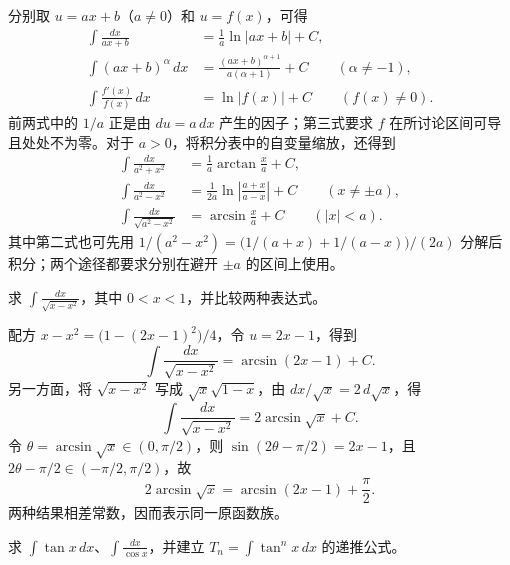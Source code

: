 分别取 $u=ax+b$（$a\neq0$）和 $u=f(x)$，可得
\begin{align*}
    \int\frac{dx}{ax+b}&=\frac1a\ln|ax+b|+C,\\
    \int(ax+b)^\alpha\,dx
        &=\frac{(ax+b)^{\alpha+1}}{a(\alpha+1)}+C
        \qquad(\alpha\neq-1),\\
    \int\frac{f'(x)}{f(x)}\,dx&=\ln|f(x)|+C
        \qquad(f(x)\neq0).
\end{align*}
前两式中的 $1/a$ 正是由 $du=a\,dx$ 产生的因子；第三式要求 $f$ 在所讨论区间可导且处处不为零。对于 $a>0$，将积分表中的自变量缩放，还得到
\begin{align}
    \int\frac{dx}{a^2+x^2}&=\frac1a\arctan\frac xa+C,
       \label{eq:scaled-arctangent-integral}\\
    \int\frac{dx}{a^2-x^2}&=\frac1{2a}\ln\left|\frac{a+x}{a-x}\right|+C
       \qquad(x\neq\pm a),\label{eq:difference-of-squares-integral}\\
    \int\frac{dx}{\sqrt{a^2-x^2}}&=\arcsin\frac xa+C
       \qquad(|x|<a).\label{eq:scaled-arcsine-integral}
\end{align}
其中第二式也可先用 $1/(a^2-x^2)=\bigl(1/(a+x)+1/(a-x)\bigr)/(2a)$ 分解后积分；两个途径都要求分别在避开 $\pm a$ 的区间上使用。

\begin{example}
\label{ex:two-substitutions-for-square-root-integral}
求 $\displaystyle\int\frac{dx}{\sqrt{x-x^2}}$，其中 $0<x<1$，并比较两种表达式。
\end{example}

\begin{solve}
配方 $x-x^2=\bigl(1-(2x-1)^2\bigr)/4$，令 $u=2x-1$，得到
\[
    \int\frac{dx}{\sqrt{x-x^2}}=\arcsin(2x-1)+C.
\]
另一方面，将 $\sqrt{x-x^2}$ 写成 $\sqrt{x}\sqrt{1-x}$，由 $dx/\sqrt{x}=2\,d\sqrt{x}$，得
\[
    \int\frac{dx}{\sqrt{x-x^2}}=2\arcsin\sqrt{x}+C.
\]
令 $\theta=\arcsin\sqrt{x}\in(0,\pi/2)$，则 $\sin(2\theta-\pi/2)=2x-1$，且 $2\theta-\pi/2\in(-\pi/2,\pi/2)$，故
\[
    2\arcsin\sqrt{x}=\arcsin(2x-1)+\frac\pi2.
\]
两种结果相差常数，因而表示同一原函数族。
\end{solve}

\begin{example}
\label{ex:tangent-secant-integrals-and-recurrence}
求 $\displaystyle\int\tan x\,dx$、$\displaystyle\int\frac{dx}{\cos x}$，并建立 $T_n=\int\tan^n x\,dx$ 的递推公式。
\end{example}

